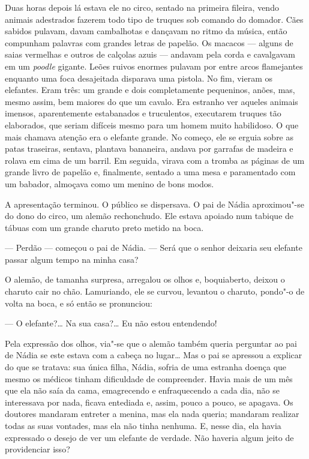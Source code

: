 Duas horas depois lá estava ele no circo, sentado na primeira fileira,
vendo animais adestrados fazerem todo tipo de truques sob comando do
domador. Cães sabidos pulavam, davam cambalhotas e dançavam no ritmo da
música, então compunham palavras com grandes letras de papelão. Os
macacos --- alguns de saias vermelhas e ou­tros de calçolas azuis ---
andavam pela corda e cavalgavam em um \emph{poodle} gigante. Leões
ruivos enormes pulavam por entre arcos flamejantes enquanto uma foca
desajei­tada disparava uma pistola. No fim, vieram os elefantes. Eram
três: um grande e dois completamente pequeninos, anões, mas, mesmo
assim, bem maiores do que um cavalo. Era estranho ver aqueles animais
imensos, aparentemen­te estabanados e truculentos, executarem truques
tão elaborados, que seriam difíceis mesmo para um homem muito
habilido­so. O que mais chamava atenção era o elefante grande. No
começo, ele se erguia sobre as patas traseiras, sentava, plantava
bananeira, andava por garrafas de ma­deira e rolava em cima de um
barril. Em seguida, virava com a tromba as páginas de um grande livro de
papelão e, finalmente, sentado a uma mesa e paramentado com um babador,
almoçava como um menino de bons modos.

A apresentação terminou. O público se dispersava. O pai de Nádia
aproximou"-se do dono do circo, um alemão rechonchudo. Ele estava apoiado
num tabique de tábuas com um grande charuto preto metido na boca.

--- Perdão --- começou o pai de Nádia. --- Será que o senhor deixaria
seu elefante passar algum tempo na minha casa?

O alemão, de tamanha surpresa, arregalou os olhos e, boquiaberto, deixou
o charuto cair no chão. Lamuriando, ele se curvou, levantou o charuto,
pondo"-o de volta na boca, e só então se pronunciou:

--- O elefante?\ldots{} Na sua casa?\ldots{} Eu não estou entendendo!

Pela expressão dos olhos, via"-se que o alemão também queria perguntar ao
pai de Nádia se este estava com a cabeça no lugar\ldots{} Mas o pai se
apressou a explicar do que se tratava: sua única filha, Nádia, sofria de
uma estranha doença que mesmo os médicos tinham dificuldade de
compreender. Havia mais de um mês que ela não saía da cama, emagrecendo
e enfraquecendo a cada dia, não se interessava por nada, ficava
entediada e, assim, pouco a pouco, se apagava. Os doutores mandaram
entreter a menina, mas ela nada queria; mandaram realizar todas as suas
vontades, mas ela não tinha nenhuma. E, nesse dia, ela havia expressado
o desejo de ver um elefante de ver­dade. Não haveria algum jeito de
providenciar isso?

